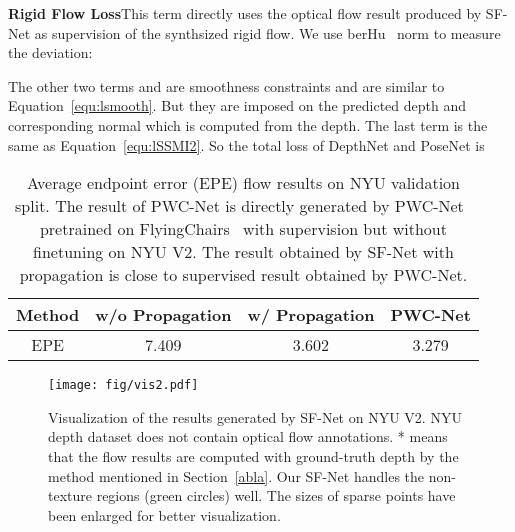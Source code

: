 \documentclass[10pt,twocolumn,letterpaper]{article}
\begin{document}
\textbf{Rigid Flow Loss}\quad This term directly uses the optical flow result produced by SF-Net as supervision of the synthsized rigid flow. We use berHu~\cite{laina2016deeper} norm  to measure the deviation:





The other two terms  and  are smoothness constraints and are similar to Equation~\ref{equ:lsmooth}. But they are imposed on the predicted depth and corresponding normal which is computed from the depth. The last term  is the same as Equation~\ref{equ:lSSMI2}. So the total loss of DepthNet and PoseNet is



\begin{table}[htbp]
\vspace{-3mm}
\renewcommand\tabcolsep{4pt}
  \centering
    \begin{tabular}{cccc}
    \toprule
    Method & w/o Propagation & w/ Propagation  & PWC-Net \\
    \midrule
    EPE   & 7.409 & 3.602  & 3.279 \\
    \bottomrule
    \end{tabular}\vspace{2mm}
  \caption{\label{tab:sa_region} Average endpoint error (EPE) flow results on NYU validation split. The result of PWC-Net is directly generated by PWC-Net~\cite{Sun2018PWC-Net} pretrained on FlyingChairs~\cite{DFIB15} with supervision but without finetuning on NYU V2. The result obtained by SF-Net with propagation is close to supervised result obtained by PWC-Net.}
  \vspace{-2mm}
\end{table}

\begin{figure*}
\begin{center}
  \texttt{[image: fig/vis2.pdf]}
\end{center}
   \vspace{-3mm}
   \caption{Visualization of the results generated by SF-Net on NYU V2. NYU depth dataset does not contain optical flow annotations. * means that the flow results are computed with ground-truth depth by the method mentioned in Section~\ref{abla}. Our SF-Net handles the non-texture regions (green circles) well. The sizes of sparse points have been enlarged for better visualization.}
\label{fig:kitti_quqa}
\vspace{-3mm}
\end{figure*}
\end{document}

